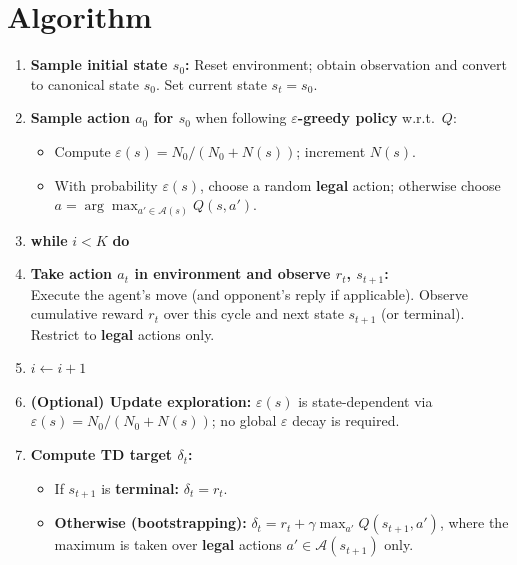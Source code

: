 \documentclass[11pt,a4paper]{article}
\begin{document}
\hrulefill

\section*{Algorithm}

\begin{enumerate}[noitemsep, leftmargin=*]
  \item \textbf{Sample initial state $s_0$:} Reset environment; obtain observation and convert to canonical state $s_0$. Set current state $s_t = s_0$.

  \item \textbf{Sample action $a_0$ for $s_0$} when following \textbf{$\varepsilon$-greedy policy} w.r.t.\ $Q$:
  \begin{itemize}[noitemsep]
    \item Compute $\varepsilon(s) = N_0 / (N_0 + N(s))$; increment $N(s)$.
    \item With probability $\varepsilon(s)$, choose a random \textbf{legal} action; otherwise choose $a = \arg\max_{a' \in \mathcal{A}(s)} Q(s, a')$.
  \end{itemize}

  \item \textbf{while} $i < K$ \textbf{do}

  \item \textbf{Take action $a_t$ in environment and observe $r_t$, $s_{t+1}$:}\\
  Execute the agent's move (and opponent's reply if applicable). Observe cumulative reward $r_t$ over this cycle and next state $s_{t+1}$ (or terminal). Restrict to \textbf{legal} actions only.

  \item $i \leftarrow i + 1$

  \item \textbf{(Optional) Update exploration:} $\varepsilon(s)$ is state-dependent via $\varepsilon(s) = N_0/(N_0 + N(s))$; no global $\varepsilon$ decay is required.

  \item \textbf{Compute TD target $\delta_t$:}
  \begin{itemize}[noitemsep]
    \item If $s_{t+1}$ is \textbf{terminal:} $\delta_t = r_t$.
    \item \textbf{Otherwise (bootstrapping):} $\delta_t = r_t + \gamma \max_{a'} Q(s_{t+1}, a')$, where the maximum is taken over \textbf{legal} actions $a' \in \mathcal{A}(s_{t+1})$ only.
  \end{itemize}


\end{enumerate}
\end{document}
